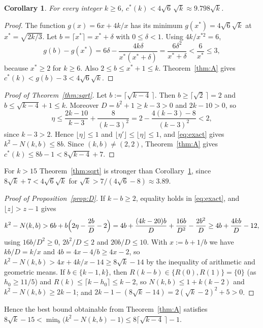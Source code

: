 \documentclass[11pt]{amsart}
\newcommand{\cs}{c^{*}}
\newtheorem{corollary}[theorem]{Corollary}
\theoremstyle{definition}
\theoremstyle{remark}
\numberwithin{equation}{section}
\begin{document}
\begin{corollary}\label{cor:B}
For every integer $k\ge6$, $\cs(k)<4\sqrt6\,\sqrt k\approx9.798\sqrt k$.
\end{corollary}

\begin{proof}
The function $g(x)=6x+4k/x$ has its minimum $g(x^*)=4\sqrt6\sqrt k$ at $x^*=\sqrt{2k/3}$. Let $b=\lceil x^*\rceil=x^*+\delta$
with $0\le\delta<1$. Using $4k/x^{*2}=6$,
\[
g(b)-g(x^*)=6\delta-\frac{4k\delta}{x^*(x^*+\delta)}=\frac{6\delta^2}{x^*+\delta}<\frac{6}{x^*}\le3,
\]
because $x^*\ge2$ for $k\ge6$. Also $2\le b\le x^*+1\le k$. Theorem~\ref{thm:A} gives $\cs(k)<g(b)-3<4\sqrt6\sqrt k$.
\end{proof}

\begin{proof}[Proof of Theorem~\ref{thm:sqrt}]
Let $b:=\lceil\sqrt{k-4}\,\rceil$. Then $b\ge\lceil\sqrt2\,\rceil=2$ and $b\le\sqrt{k-4}+1\le k$. Moreover $D=b^2+1\ge k-3>0$
and $2k-10>0$, so
\[
\eta\le\frac{2k-10}{k-3}+\frac{8}{(k-3)^2}=2-\frac{4(k-3)-8}{(k-3)^2}<2,
\]
since $k-3>2$. Hence $\lfloor\eta\rfloor\le1$ and $\lfloor\eta'\rfloor\le\lfloor\eta\rfloor\le1$, and \eqref{eq:exact} gives
$k^2-N(k,b)\le8b$. Since $(k,b)\ne(2,2)$, Theorem~\ref{thm:A} gives $\cs(k)\le8b-1<8\sqrt{k-4}+7$.
\end{proof}

For $k>15$ Theorem~\ref{thm:sqrt} is stronger than Corollary~\ref{cor:B}, since $8\sqrt k+7<4\sqrt6\sqrt k$ for
$\sqrt k>7/(4\sqrt6-8)\approx3.89$.

\begin{proof}[Proof of Proposition~\ref{prop:D}]
If $k-b\ge2$, equality holds in \eqref{eq:exact}, and $\lfloor z\rfloor>z-1$ gives
\[
k^2-N(k,b)>6b+b\Bigl(2\eta-\frac{2b}{D}-2\Bigr)=4b+\frac{(4k-20)b}{D}+\frac{16b}{D^2}-\frac{2b^2}{D}
\ge4b+\frac{4kb}{D}-12,
\]
using $16b/D^2\ge0$, $2b^2/D\le2$ and $20b/D\le10$. With $x:=b+1/b$ we have $kb/D=k/x$ and $4b=4x-4/b\ge4x-2$, so
$k^2-N(k,b)>4x+4k/x-14\ge8\sqrt k-14$ by the inequality of arithmetic and geometric means. If $b\in\{k-1,k\}$, then
$R(k-b)\in\{R(0),R(1)\}=\{0\}$ (as $h_0\ge11/5$) and $R(k)\le\lceil k-h_0\rceil\le k-2$, so $N(k,b)\le1+k(k-2)$ and
$k^2-N(k,b)\ge2k-1$; and $2k-1-(8\sqrt k-14)=2(\sqrt k-2)^2+5>0$.
\end{proof}

Hence the best bound obtainable from Theorem~\ref{thm:A} satisfies
$8\sqrt k-15<\min_b\bigl(k^2-N(k,b)-1\bigr)\le8\lceil\sqrt{k-4}\,\rceil-1$.
\end{document}
